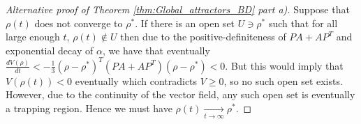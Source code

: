 \documentclass{article}
\begin{document}
\begin{proof}[Alternative proof of Theorem \ref{thm:Global_attractors_BD} part a)]




Suppose that $\rho(t)$ does not converge to $\rho^{*}$. If there is an open set $U\ni\rho^{*}$ such that for all large enough $t$, $\rho(t)\notin{}U$  then due to the positive-definiteness of $PA+AP^T$ and exponential decay of $\alpha$, we have that eventually $\frac{dV(\rho)}{dt}<-\frac{1}{3}(\rho-\rho^{*})^T(PA+AP^T)(\rho-\rho^{*})<0$.  But this would imply that $V(\rho(t))<0$ eventually which contradicts $V\geq{0}$, so no such open set exists. However, due to the continuity of the vector field, any such open set is eventually a trapping region.  Hence we must have $\rho(t)\xrightarrow[t\rightarrow\infty]{}\rho_{}^{*}$.

    
\end{proof}
\end{document}
